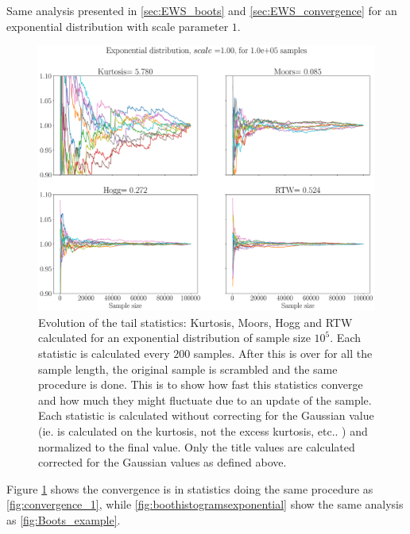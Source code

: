 Same analysis presented in 	\ref{sec:EWS_boots} and \ref{sec:EWS_convergence} for an exponential distribution with scale parameter $1$.

\begin{figure}[htb]
	\centering
	\includegraphics[width=\linewidth]{Images/Metrics/boot_exponential_convergence}
	\caption{ Evolution of the tail statistics: Kurtosis, Moors, Hogg and RTW calculated for an exponential distribution of sample size $10^5$. 
		Each statistic is calculated every $200$ samples. After this is over for all the sample length, the original sample is scrambled and the same procedure is done. This is to show how fast this statistics converge and how much they might fluctuate due to an update of the sample. 
		Each statistic is calculated without correcting for the Gaussian value (ie. is calculated on  the kurtosis, not the excess kurtosis, etc.. ) and normalized to the final value. Only the title values are calculated corrected for the Gaussian values as defined above.}
	\label{fig:bootexponentialconvergence}
\end{figure}

Figure \ref{fig:bootexponentialconvergence} shows the convergence is in statistics doing the same procedure as \cref{fig:convergence_1}, while \cref{fig:boothistogramsexponential} show the same analysis as \cref{fig:Boots_example}.

